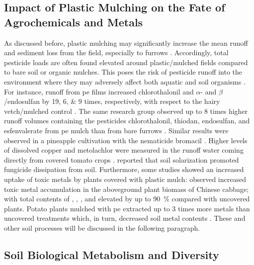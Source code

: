 \subsection{Impact of Plastic Mulching on the Fate of Agrochemicals and Metals}

As discussed before, plastic mulching may significantly increase the mean runoff and sediment loss from the field, especially to furrows \citep{WanRunoff1999,ZhangInfluences2014,ZhangDistribution2015}. Accordingly, total pesticide loads are often found elevated around plastic\-/mulched fields compared to bare soil or organic mulches. This poses the risk of pesticide runoff into the environment where they may adversely affect both aquatic and soil organisms \citep{ArnoldRunoff2004,DietrichFate2014}. For instance, runoff from \ac{pe} films increased chlorothalonil and $\alpha$- and $\beta$\-/endosulfan by \numlist{19;6;9} times, respectively, with respect to the hairy vetch\-/mulched control \citep{RiceRunoff2001}. The same research group observed up to \num{8} times higher runoff volumes containing the pesticides chlorothalonil, thiodan, endosulfan, and esfenvalerate from \ac{pe} mulch than from bare furrows \citep{RiceEvaluation2007}. Similar results were observed in a pineapple cultivation with the nematicide bromacil \citep{AlaviEvaluation2007}. Higher levels of dissolved copper and metolachlor were measured in the runoff water coming directly from covered tomato crops \citep{ArnoldRunoff2004,RiceComparison2002}.  reported that soil solarization promoted fungicide dissipation from soil. Furthermore, some studies showed an increased uptake of toxic metals by plants covered with plastic mulch: \citet{MorenoAccumulation2002} observed increased toxic metal accumulation in the aboveground plant biomass of Chinese cabbage; with total contents of , , , and  elevated by up to \SI{90}{\percent} compared with uncovered plants. Potato plants mulched with \ac{pe} extracted up to \num{3} times more metals than uncovered treatments which, in turn, decreased soil metal contents \citep{BaghourInfluence2001,BaghourInfluence2002}. These and other soil processes will be discussed in the following paragraph.

\subsection{Soil Biological Metabolism and Diversity}

